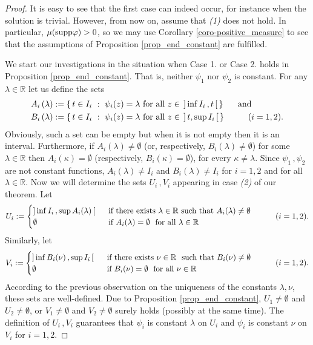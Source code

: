 \documentclass[12pt]{amsart}
\theoremstyle{remark}
\theoremstyle{definition}
\newcommand{\RR}{\mathbb{R}}
\newcommand{\supp}{\mbox{\rm supp}}
\begin{document}
\begin{proof}
It is easy to see that the first case can indeed occur, 
for instance when the solution is trivial. 
However, from now on, assume that \emph{(1)} 
does not hold. 
In particular, 
$ \mu ( \supp \varphi ) > 0 $, 
so we may use Corollary \ref{coro-positive_measure} 
to see that the assumptions of 
Proposition \ref{prop_end_constant} are fulfilled. 

We start our investigations in the situation when 
Case 1. or Case 2. holds in 
Proposition \ref{prop_end_constant}. 
That is, neither $ \psi_1 $ nor $ \psi_2 $ is constant. 
For any $ \lambda \in \RR $ let us define the sets 
\begin{align*}
A_i \left( \lambda \right) & := 
\lbrace \, 
t \in I_i \ : \ \psi_i(z) = \lambda 
\mbox{ for all } z \in \, 
\left] \,  \inf I_i \,, t \, \right[ \, 
\rbrace 
\hspace{5mm} \mbox{ and } \\ 
B_i \left( \lambda \right) & := 
\lbrace \, 
t \in I_i \ : \ \psi_i(z) = \lambda 
\mbox{ for all } z \in \, 
\left] \, t , \sup I_i \, \right[ \, 
\rbrace 
\hspace{10mm} (i=1,2). 
\end{align*} 
Obviously, such a set can be empty 
but when it is not empty 
then it is an interval.
Furthermore, if 
$ A_i( \lambda ) \neq \emptyset $ 
(or, respectively, $ B_i(\lambda) \neq \emptyset $) 
for some 
$ \lambda \in \RR $ then 
$ A_i( \kappa ) = \emptyset $ 
(respectively, $ B_i( \kappa ) = \emptyset $), 
for every $ \kappa \neq \lambda $. 
Since $ \psi_1 \,, \psi_2 $ are not constant functions, 
$ A_i (\lambda) \neq I_i $ and 
$ B_i (\lambda) \neq I_i $ for $ i = 1,2 $ and 
for all $ \lambda \in \RR $. 
Now we will determine the sets 
$ U_i \,, V_i $ appearing in 
case \emph{(2)} of our theorem. 
Let 
\[
U_i := 
\begin{cases}
\left] \, \inf I_i \,, \sup A_i(\lambda) \, \right[ 
\ & \mbox{ if there exists } \lambda \in \RR 
\mbox{ such that } A_i(\lambda) \neq \emptyset \\ 
\emptyset 
\ & \mbox{ if } A_i(\lambda) = \emptyset 
\ \mbox{ for all } \lambda \in \RR 
\end{cases} 
\hspace{10 mm} (i=1,2). 
\]
Similarly, let 
\[
V_i := 
\begin{cases}
\left] \, \inf B_i(\nu) \,, \sup I_i \, \right[ 
\ & \mbox{ if there exists } \nu \in \RR 
\ \mbox{ such that } B_i(\nu) \neq \emptyset \\ 
\emptyset 
\ & \mbox{ if } B_i(\nu) = \emptyset 
\ \mbox{ for all } \nu \in \RR 
\end{cases} 
\hspace{10 mm} (i=1,2). 
\]
According to the previous observation 
on the uniqueness of the constants 
$ \lambda, \nu $, these sets are well-defined. 
Due to Proposition \ref{prop_end_constant}, 
$ U_1 \neq \emptyset $ and $ U_2 \neq \emptyset $, or 
$ V_1 \neq \emptyset $ and $ V_2 \neq \emptyset $ 
surely holds (possibly at the same time). 
The definition of $ U_i \,, V_i $ guarantees that 
$ \psi_i $ is constant $ \lambda $ on $ U_i $ and 
$ \psi_i $ is constant $ \nu $ on $ V_i $ for 
$ i = 1,2 $. 


\end{proof}
\end{document}
